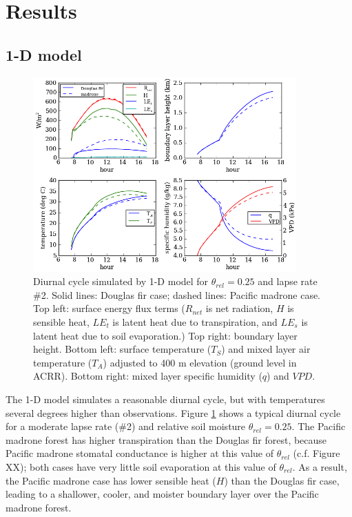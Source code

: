 \section{Results}

\subsection{1-D model}

\begin{figure}[here]
\includegraphics[width=0.9\textwidth]{ch2-BL/figures/testall_Aug15_soilm0pt25_ra10_lapseT2_cropped.png}
\caption{Diurnal cycle simulated by 1-D model for $\theta_{rel}=0.25$ and lapse rate \#2.  Solid lines: Douglas fir case; dashed lines: Pacific madrone case.  Top left: surface energy flux terms ($R_{net}$ is net radiation, $H$ is sensible heat, $LE_t$ is latent heat due to transpiration, and $LE_s$ is latent heat due to soil evaporation.)  Top right: boundary layer height.  Bottom left: surface temperature ($T_S$) and mixed layer air temperature ($T_A$) adjusted to 400 m elevation (ground level in ACRR).  Bottom right: mixed layer specific humidity ($q$) and $VPD$.}
\label{fig:BL_1Ddiurnal}
\end{figure}

The 1-D model simulates a reasonable diurnal cycle, but with temperatures several degrees higher than observations.  Figure \ref{fig:BL_1Ddiurnal} shows a typical diurnal cycle for a moderate lapse rate (\#2) and relative soil moisture $\theta_{rel} = 0.25$.  The Pacific madrone forest has higher transpiration than the Douglas fir forest, because Pacific madrone stomatal conductance is higher at this value of $\theta_{rel}$ (c.f. Figure XX); both cases have very little soil evaporation at this value of $\theta_{rel}$.  As a result, the Pacific madrone case has lower sensible heat ($H$) than the Douglas fir case, leading to a shallower, cooler, and moister boundary layer over the Pacific madrone forest.

